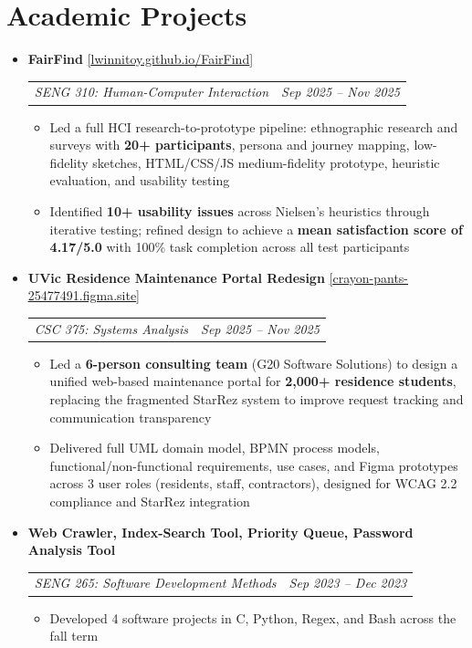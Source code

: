 \documentclass[10pt,letterpaper]{article}
\makeatletter
\newcommand{\resumeProjectHeading}[5]{%
  \vspace{5pt}%
  \item[]%
    {\small \textbf{#1} \enspace \href{#5}{\textcolor{accentblue}{[\underline{#2}]}}}\\[2pt]%
    {\small \begin{tabular*}{0.99\textwidth}{l@{\extracolsep{\fill}}r}%
      \textcolor{midgray}{\textit{\hspace{2pt}#3}} & \textcolor{midgray}{\textit{#4}}%
    \end{tabular*}}%
  \vspace{3pt}%
}
\newcommand{\resumeProjectHeadingNoLink}[3]{%
  \vspace{5pt}%
  \item[]%
    {\small \textbf{#1}}\\[2pt]%
    {\small \begin{tabular*}{0.99\textwidth}{l@{\extracolsep{\fill}}r}%
      \textcolor{midgray}{\textit{\hspace{2pt}#2}} & \textcolor{midgray}{\textit{#3}}%
    \end{tabular*}}%
  \vspace{3pt}%
}
\newcommand{\resumeItem}[1]{
  \item {\small #1}
}
\makeatother
\begin{document}
\section{Academic Projects}
\begin{itemize}[leftmargin=0in, label={}]

  \resumeProjectHeading
    {FairFind}{lwinnitoy.github.io/FairFind}
    {SENG 310: Human-Computer Interaction}
    {Sep 2025 -- Nov 2025}
    {https://lwinnitoy.github.io/FairFind}
  \begin{itemize}
    \resumeItem{Led a full HCI research-to-prototype pipeline: ethnographic research and surveys with \textbf{20+ participants}, persona and journey mapping, low-fidelity sketches, HTML/CSS/JS medium-fidelity prototype, heuristic evaluation, and usability testing}
    \resumeItem{Identified \textbf{10+ usability issues} across Nielsen's heuristics through iterative testing; refined design to achieve a \textbf{mean satisfaction score of 4.17/5.0} with 100\% task completion across all test participants}
  \end{itemize}

  \resumeProjectHeading
    {UVic Residence Maintenance Portal Redesign}{crayon-pants-25477491.figma.site}
    {CSC 375: Systems Analysis}
    {Sep 2025 -- Nov 2025}
    {https://crayon-pants-25477491.figma.site}
  \begin{itemize}
    \resumeItem{Led a \textbf{6-person consulting team} (G20 Software Solutions) to design a unified web-based maintenance portal for \textbf{2,000+ residence students}, replacing the fragmented StarRez system to improve request tracking and communication transparency}
    \resumeItem{Delivered full UML domain model, BPMN process models, functional/non-functional requirements, use cases, and Figma prototypes across 3 user roles (residents, staff, contractors), designed for WCAG 2.2 compliance and StarRez integration}
  \end{itemize}

  \resumeProjectHeadingNoLink
    {Web Crawler, Index-Search Tool, Priority Queue, Password Analysis Tool}
    {SENG 265: Software Development Methods}
    {Sep 2023 -- Dec 2023}
  \begin{itemize}
    \resumeItem{Developed 4 software projects in C, Python, Regex, and Bash across the fall term}
  \end{itemize}

\end{itemize}

\end{document}
